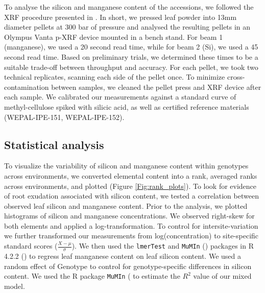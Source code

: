 \documentclass[12pt, letterpaper, ]{report}
\begin{document}
To analyse the silicon and manganese content of the accessions, we followed the XRF procedure presented in \textcite{reidinger_rapid_2012}. In short, we pressed leaf powder into 13mm diameter pellets at 300 bar of pressure and analysed the resulting pellets in an Olympus Vanta p-XRF device mounted in a bench stand. For beam 1 (manganese), we used a 20 second read time, while for beam 2 (Si), we used a 45 second read time. Based on preliminary trials, we determined these times to be a suitable trade-off between throughput and accuracy. For each pellet, we took two technical replicates, scanning each side of the pellet once. To minimize cross-contamination between samples, we cleaned the pellet press and XRF device after each sample. We calibrated our measurements against a standard curve of methyl-cellulose spiked with silicic acid, as well as certified reference materials (WEPAL-IPE-151, WEPAL-IPE-152).

\subsection{Statistical analysis}

To visualize the variability of silicon and manganese content within genotypes across environments, we converted elemental content into a rank, averaged ranks across environments, and plotted (Figure \ref{Fig:rank_plots}). 
To look for evidence of root exudation associated with silicon content, we tested a correlation between observed leaf silicon and manganese content. Prior to the analysis, we plotted histograms of silicon and manganese concentrations. We observed right-skew for both elements and applied a log-transformation. To control for intersite-variation we further transformed our measurements from log(concentration) to site-specific standard scores ($\frac{X - \mu}{\sigma}$). We then used the \verb|lmerTest| and \verb|MuMIn| (\cite{kuznetsova_2017_lmerTest,barton_2023_mumin}) packages in R 4.2.2 (\cite{r_core_team_2022}) to regress leaf manganese content on leaf silicon content. We used a random effect of Genotype to control for genotype-specific differences in silicon content. We used the R package \verb|MuMIn| (\cite{barton_2023_mumin} to estimate the $R^2$ value of our mixed model.
\end{document}
